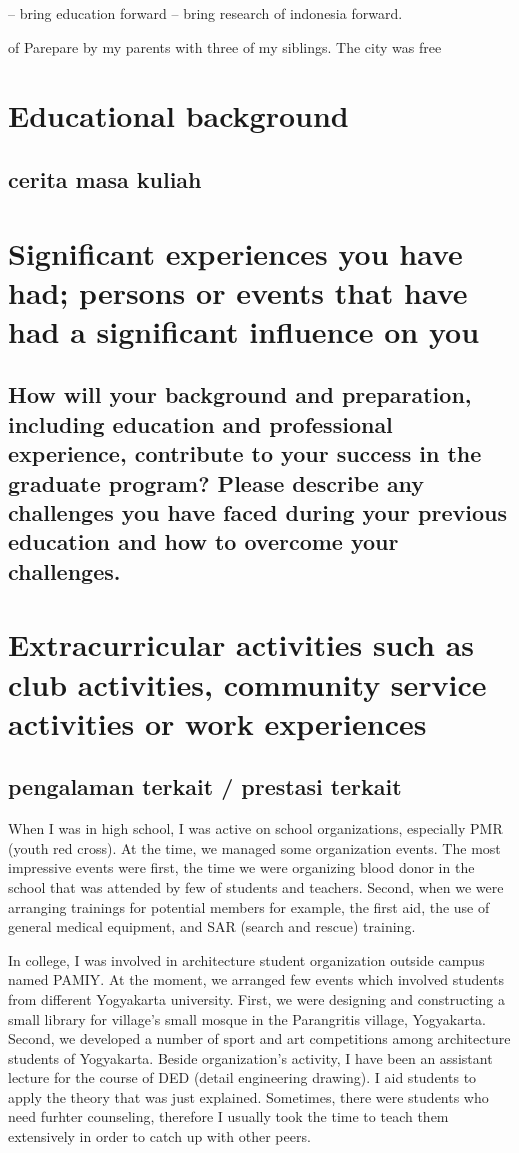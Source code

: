 \documentclass[11pt]{simart} %
\begin{document}
-- bring education forward
-- bring research of indonesia forward.

of Parepare by my parents with three of my siblings.
The city was free

\section{Educational background}
\subsection{cerita masa kuliah}

\section{Significant experiences you have had; persons or events that have had a significant influence on you}
\subsection{How will your background and preparation, including education and professional experience, contribute to your success in the graduate program? Please describe any challenges you have faced during your previous education and how to overcome your challenges.}

\section{Extracurricular activities such as club activities, community service activities or work experiences}
\subsection{pengalaman terkait / prestasi terkait}
When I was in high school, I was active on school organizations, especially PMR (youth red cross). At the time, we managed some organization events. The most impressive events were first, the time we were organizing blood donor in the school that was attended by few of students and teachers. Second, when we were arranging trainings for potential members for example, the first aid, the use of general medical equipment, and SAR (search and rescue) training.

In college, I was involved in architecture student organization outside campus named PAMIY. At the moment, we arranged few events which involved students from different Yogyakarta university. First, we were designing and constructing a small library for village's small mosque in the Parangritis village, Yogyakarta. Second, we developed a number of sport and art competitions among architecture students of Yogyakarta. Beside organization's activity, I have been an assistant lecture for the course of DED (detail engineering drawing). I aid students to apply the theory that was just explained. Sometimes, there were  students who need furhter counseling, therefore I usually took the time to teach them extensively in order to catch up with other peers.
\end{document}
